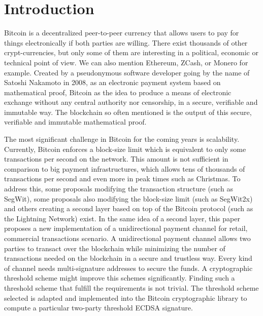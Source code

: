 \chapter{Introduction}
\label{chap:introduction}

Bitcoin is a decentralized peer-to-peer currency that allows users to pay for
things electronically if both parties are willing. There exist thousands of
other crypt-currencies, but only some of them are interesting in a political,
economic or technical point of view. We can also mention Ethereum, ZCash, or
Monero for example. Created by a pseudonymous software developer going by the
name of Satoshi Nakamoto in 2008, as an electronic payment system based on
mathematical proof, Bitcoin as the idea to produce a means of electronic
exchange without any central authority nor censorship, in a secure, verifiable
and immutable way. The blockchain so often mentioned is the output of this
secure, verifiable and immutable mathematical proof.

The most significant challenge in Bitcoin for the coming years is scalability.
Currently, Bitcoin enforces a block-size limit which is equivalent to only some
transactions per second on the network. This amount is not sufficient in
comparison to big payment infrastructures, which allows tens of thousands of
transactions per second and even more in peak times such as Christmas. To
address this, some proposals modifying the transaction structure (such as
SegWit), some proposals also modifying the block-size limit (such as SegWit2x)
and others creating a second layer based on top of the Bitcoin protocol (such as
the Lightning Network) exist. In the same idea of a second layer, this paper
proposes a new implementation of a unidirectional payment channel for retail,
commercial transactions scenario. A unidirectional payment channel allows two
parties to transact over the blockchain while minimizing the number of
transactions needed on the blockchain in a secure and trustless way. Every kind
of channel needs multi-signature addresses to secure the funds. A cryptographic
threshold scheme might improve this schemes significantly. Finding such a
threshold scheme that fulfill the requirements is not trivial. The threshold
scheme selected is adapted and implemented into the Bitcoin cryptographic
library to compute a particular two-party threshold ECDSA signature.

